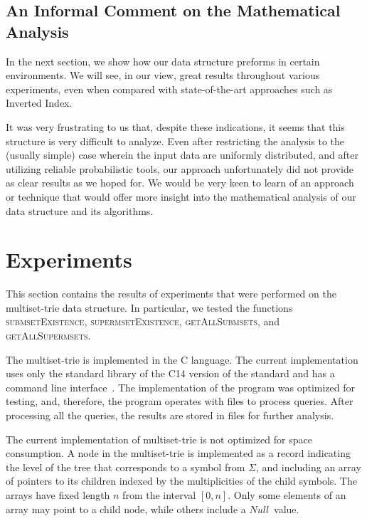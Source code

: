 \documentclass[algorithms,article,accept,pdftex,moreauthors]{Definitions/mdpi}
\newcommand{\CC}{C\nolinebreak\hspace{-.05em}\raisebox{.4ex}{\tiny\bf ++}}
\begin{document}
\subsection{An Informal Comment on the Mathematical Analysis}
In the next section, we show how our data structure preforms in certain environments.
We will see, in our view, great results throughout various experiments, even when compared with state-of-the-art approaches such as Inverted Index.

It was very frustrating to us that, despite these indications, it seems that this structure is very difficult to analyze. 
Even after restricting the analysis to the (usually simple) case wherein the input data are uniformly distributed, and after utilizing reliable probabilistic tools, our approach unfortunately did not provide as clear results as we hoped for. 
We would be very keen to learn of an approach or technique that would offer more insight into the mathematical analysis of our data structure and its algorithms. 




%
\section{Experiments} \label{c:experiments}

%
This section contains the results of experiments that were performed on the multiset-trie 
data structure. In particular, we tested the functions \textsc{submsetExistence}, 
\textsc{supermsetExistence}, \textsc{getAllSubmsets}, and \textsc{getAllSupermsets}. 

The multiset-trie is implemented in the \CC { programming} language. 
The current implementation uses only the standard library of the \CC14 version of the 
standard and has a command line interface~\cite{akulich2019mstrie}. The implementation of the program was 
optimized for testing, and, therefore, the program operates with files to 
process queries. After processing all the queries, the results are stored in files for further analysis.

The current implementation of multiset-trie is not optimized for space consumption.
A node in the multiset-trie is implemented as a record indicating the level of the tree
that corresponds to a symbol from $\Sigma$, and including an array of pointers to
its children indexed by the multiplicities of the child symbols. The arrays have
fixed length $n$ from the interval $[0,n].$
Only some elements of an array may point to a child node, while others include a
$Null$~value.
\end{document}

